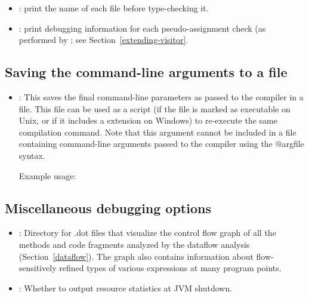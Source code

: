 \begin{itemize}

\item {}: print the name of each file before type-checking it.

\item {}: print debugging information for each
pseudo-assignment check (as performed by
; see
Section~\ref{extending-visitor}.

\end{itemize}

\subsection{Saving the command-line arguments to a file\label{debugging-options-output-args}}

\begin{itemize}

\item {}:
  This saves the final command-line parameters as passed to the compiler in a file.
  This file can be used as a script (if the file is marked as executable on Unix, or
  if it includes a  extension on Windows) to re-execute the same compilation command.
  Note that this argument cannot be included in a file containing command-line arguments
  passed to the compiler using the @argfile syntax.

  Example usage: 

\end{itemize}

\subsection{Miscellaneous debugging options\label{debugging-options-misc}}

\begin{itemize}

\item {}:
  Directory for .dot files that visualize the control flow graph of all the methods and code fragments
  analyzed by the dataflow analysis (Section~\ref{dataflow}).
  The graph also contains information about flow-sensitively refined
  types of various expressions at many program points.

\item {}:
  Whether to output resource statistics at JVM shutdown.

\end{itemize}


